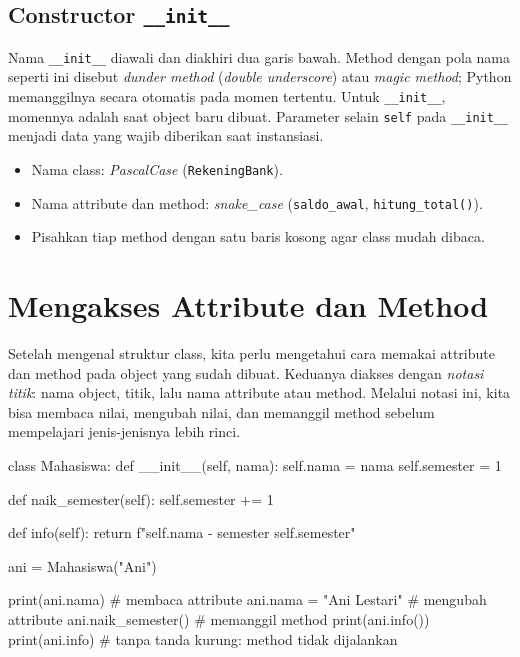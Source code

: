 \subsection{Constructor \texttt{\_\_init\_\_}}

Nama \texttt{\_\_init\_\_} diawali dan diakhiri dua garis bawah. Method dengan pola nama seperti ini disebut \emph{dunder method} (\emph{double underscore}) atau \emph{magic method}; Python memanggilnya secara otomatis pada momen tertentu. Untuk \texttt{\_\_init\_\_}, momennya adalah saat object baru dibuat. Parameter selain \texttt{self} pada \texttt{\_\_init\_\_} menjadi data yang wajib diberikan saat instansiasi.

\begin{tips}
\begin{itemize}
  \item Nama class: \emph{PascalCase} (\texttt{RekeningBank}).
  \item Nama attribute dan method: \emph{snake\_case} (\texttt{saldo\_awal}, \texttt{hitung\_total()}).
  \item Pisahkan tiap method dengan satu baris kosong agar class mudah dibaca.
\end{itemize}
\end{tips}

\section{Mengakses Attribute dan Method}

Setelah mengenal struktur class, kita perlu mengetahui cara memakai attribute dan method pada object yang sudah dibuat. Keduanya diakses dengan \emph{notasi titik}: nama object, titik, lalu nama attribute atau method. Melalui notasi ini, kita bisa membaca nilai, mengubah nilai, dan memanggil method sebelum mempelajari jenis-jenisnya lebih rinci.

\begin{kode}
class Mahasiswa:
    def __init__(self, nama):
        self.nama = nama
        self.semester = 1

    def naik_semester(self):
        self.semester += 1

    def info(self):
        return f"{self.nama} - semester {self.semester}"

ani = Mahasiswa("Ani")

print(ani.nama)          # membaca attribute
ani.nama = "Ani Lestari" # mengubah attribute
ani.naik_semester()      # memanggil method
print(ani.info())
print(ani.info)          # tanpa tanda kurung: method tidak dijalankan
\end{kode}


